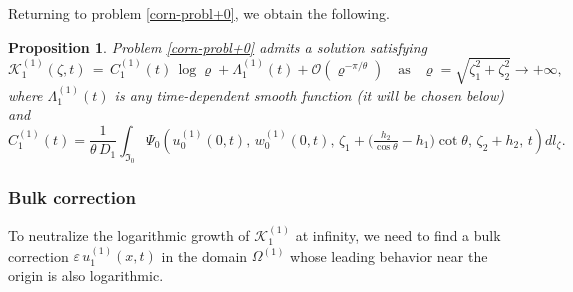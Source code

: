 \documentclass[reqno]{amsart}            %
\newtheorem{proposition}{Proposition}[section]
\numberwithin{equation}{section}
\begin{document}
	
	Returning to problem \eqref{corn-probl+0}, we obtain the following.
	\begin{proposition}\label{prop-2-4}
		Problem \eqref{corn-probl+0} admits a solution satisfying
		\begin{equation}\label{asym-3}
			\mathcal{K}^{(1)}_1(\zeta,t)
			\, = \,  C_1^{(1)}(t)\, \log \varrho + \Lambda_1^{(1)}(t) + \mathcal{O}\!\left(\varrho^{-\pi/\theta}\right)
			\quad \text{as } \ \ \varrho = \sqrt{\zeta_1^2 + \zeta_2^2} \to +\infty,
		\end{equation}
		where $\Lambda_1^{(1)}(t)$ is any  time-dependent smooth  function (it will be chosen below) and
		\begin{equation}\label{const-2}
			C_1^{(1)}(t)
			= \frac{1}{\theta\, D_1}
			\int_{\mathfrak{I}_0}
			\Psi_0\!\left(u_0^{(1)}(0,t),\, w_0^{(1)}(0,t),\,
			\zeta_1 + \big(\tfrac{h_2}{\cos\theta}-h_1\big)\cot\theta,\,
			\zeta_2 + h_2,\,
			t \right) dl_\zeta .
		\end{equation}
	\end{proposition}
	
	\subsubsection{Bulk correction}\label{bulk-corr}
	To neutralize the logarithmic growth of $\mathcal{K}_1^{(1)}$ at infinity, we
	need to find a bulk correction $\varepsilon\,u_1^{(1)}(x,t)$ in the domain
	$\Omega^{(1)}$ whose leading behavior near the origin is also logarithmic.
	
\end{document}
